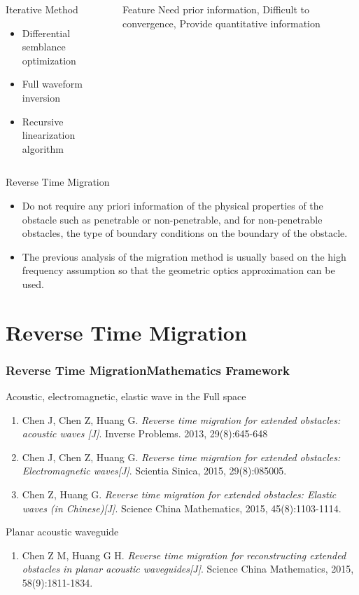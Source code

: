 \documentclass[cjk,8pt]{beamer}
\begin{document}
\begin{CJK*}{GBK}{kai}
\begin{frame}
\begin{columns}
\begin{block}{Iterative Method}
\begin{itemize}
  \item Differential semblance optimization
  \item Full waveform inversion
  \item Recursive linearization  algorithm
\end{itemize}
\end{block}
\begin{block}{Feature}
 Need prior information, Difficult to convergence, Provide quantitative information
\end{block}
\end{columns}
\begin{block}{Reverse Time Migration}
 \begin{itemize}
 \item Do not require any priori information
of the physical properties of the obstacle such as penetrable or non-penetrable, and
for non-penetrable obstacles, the type of boundary conditions on the boundary of the
obstacle.
  \item The previous analysis of the migration
method is usually based on the high frequency assumption so that the geometric optics
approximation can be used.
\end{itemize}
\end{block}
\end{frame}

\section{Reverse Time Migration}


\begin{frame}
\frametitle{Reverse Time MigrationMathematics Framework}
\begin{small}
\begin{block}{Acoustic, electromagnetic, elastic wave in the Full space}
\begin{enumerate}
  \item Chen J, Chen Z, Huang G. {\it Reverse time migration for extended obstacles: acoustic waves [J]}. Inverse Problems. 2013, 29(8):645-648
  \item Chen J, Chen Z, Huang G. {\it Reverse time migration for extended obstacles: Electromagnetic waves[J]}. Scientia Sinica, 2015, 29(8):085005.
  \item Chen Z, Huang G. {\it Reverse time migration for extended obstacles: Elastic waves (in Chinese)[J]}. Science China Mathematics, 2015, 45(8):1103-1114.
\end{enumerate}
\end{block}
\begin{block}{Planar acoustic waveguide}
\begin{enumerate}
  \item Chen Z M, Huang G H. {\it Reverse time migration for reconstructing extended obstacles in planar acoustic waveguides[J]}. Science China Mathematics, 2015, 58(9):1811-1834.
\end{enumerate}
\end{block}


\end{small}
\end{frame}
\end{CJK*}
\end{document}
